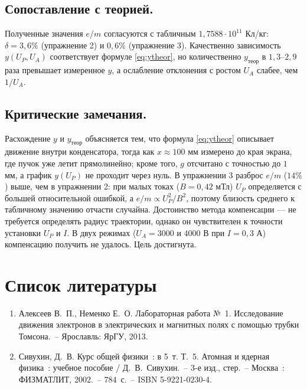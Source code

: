 \documentclass[12pt, a4paper]{article}
\begin{document}
	\subsection*{Сопоставление с теорией.}
	Полученные значения $e/m$ согласуются с табличным $1{,}7588 \cdot 10^{11}$ Кл/кг: $\delta = 3{,}6\%$ (упражнение 2) и $0{,}6\%$ (упражнение 3). Качественно зависимость $y(U_P, U_A)$ соответствует формуле \eqref{eq:ytheor}, но количественно $y_{\text{теор}}$ в $1{,}3$--$2{,}9$ раза превышает измеренное $y$, а ослабление отклонения с ростом $U_A$ слабее, чем $1/U_A$.
	
	\subsection*{Критические замечания.}
	Расхождение $y$ и $y_{\text{теор}}$ объясняется тем, что формула \eqref{eq:ytheor} описывает движение внутри конденсатора, тогда как $x \approx 100$ мм измерено до края экрана, где пучок уже летит прямолинейно; кроме того, $g$ отсчитано с точностью до $1$ мм, а график $y(U_P)$ не проходит через нуль. В упражнении 3 разброс $e/m$ ($14\%$) выше, чем в упражнении 2: при малых токах ($B = 0{,}42$ мТл) $U_P$ определяется с большей относительной ошибкой, а $e/m \propto U_P^2/B^2$, поэтому близость среднего к табличному значению отчасти случайна. Достоинство метода компенсации --- не требуется определять радиус траектории, однако он чувствителен к точности установки $U_P$ и $I$. В двух режимах ($U_A = 3000$ и $4000$ В при $I = 0{,}3$ А) компенсацию получить не удалось. Цель достигнута.
	
	\newpage
	\section*{Список литературы}
	
	\begin{enumerate}
		\item Алексеев В.~П., Неменко Е.~О. Лабораторная работа №~1. Исследование движения электронов в электрических и магнитных полях с помощью трубки Томсона.~-- Ярославль: ЯрГУ, 2013.
		\item Сивухин, Д.~В. Курс общей физики~: в 5~т. Т.~5. Атомная и ядерная физика~: учебное пособие / Д.~В.~Сивухин.~-- 3-е изд., стер.~-- Москва~: ФИЗМАТЛИТ, 2002.~-- 784~с.~-- ISBN 5-9221-0230-4.
	\end{enumerate}
	
\end{document}
